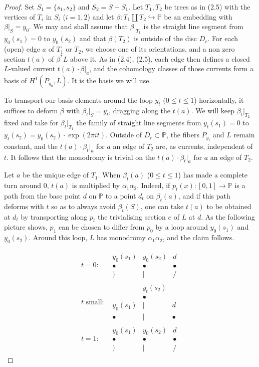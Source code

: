 \documentclass[12pt,a4paper]{article}
\theoremstyle{plain}
\theoremstyle{definition}
\theoremstyle{remark}
\newcommand{\PP}{\mathbb{P}}
\numberwithin{equation}{section}
\providecommand{\PP}{\mathbb{P}}
\begin{document}
\begin{proof}
Set $S_1 = \{s_1, s_2\}$ and $S_2 = S - S_1$. Let $T_1, T_2$ be trees as in (2.5) with the vertices of $T_i$ in $S_i$ ($i = 1, 2$) and let $\beta: T_1 \amalg T_2 \hookrightarrow \PP$ be an embedding with $\beta|_S = y_0$. We may and shall assume that $\beta|_{T_1}$ is the straight line segment from $y_0(s_1) = 0$ to $y_0(s_2)$ and that $\beta(T_2)$ is outside of the disc $D_r$. For each (open) edge $a$ of $T_1$ or $T_2$, we choose one of its orientations, and a non zero section $t(a)$ of $\beta^*L$ above it. As in (2.4), (2.5), each edge then defines a closed $L$-valued current $t(a) \cdot \beta|_a$, and the cohomology classes of those currents form a basis of $H^1(P_{y_0}, L)$. It is the basis we will use.

To transport our basis elements around the loop $y_t$ ($0 \leq t \leq 1$) horizontally, it suffices to deform $\beta$ with $\beta_t|_S = y_t$, dragging along the $t(a)$. We will keep $\beta_t|_{T_2}$ fixed and take for $\beta_t|_{T_1}$ the family of straight line segments from $y_t(s_1) = 0$ to $y_t(s_2) = y_0(s_2) \cdot \exp(2\pi i t)$. Outside of $D_r \subset \PP$, the fibers $P_{y_t}$ and $L$ remain constant, and the $t(a) \cdot \beta_t|_a$ for $a$ an edge of $T_2$ are, as currents, independent of $t$. It follows that the monodromy is trivial on the $t(a) \cdot \beta_t|_a$ for $a$ an edge of $T_2$.

Let $a$ be the unique edge of $T_1$. When $\beta_t(a)$ ($0 \leq t \leq 1$) has made a complete turn around $0$, $t(a)$ is multiplied by $\alpha_1 \alpha_2$. Indeed, if $p_t(x): [0, 1] \to \PP$ is a path from the base point $d$ on $\PP$ to a point $d_t$ on $\beta_t(a)$, and if this path deforms with $t$ so as to always avoid $\beta_t(S)$, one can take $t(a)$ to be obtained at $d_t$ by transporting along $p_t$ the trivialising section $e$ of $L$ at $d$. As the following picture shows, $p_1$ can be chosen to differ from $p_0$ by a loop around $y_0(s_1)$ and $y_0(s_2)$. Around this loop, $L$ has monodromy $\alpha_1 \alpha_2$, and the claim follows.

\[
\begin{array}{cc}
\text{$t = 0$:} & \begin{matrix} y_0(s_1) & y_0(s_2) & d \\ \bullet & \bullet & \bullet \\ ) & | & / \end{matrix} \\[2em]
\text{$t$ small:} & \begin{matrix} & y_t(s_2) & \\ & \bullet & \\ y_0(s_1) & | & d \\ \bullet & | & \bullet \end{matrix} \\[2em]
\text{$t = 1$:} & \begin{matrix} y_0(s_1) & y_0(s_2) & d \\ \bullet & \bullet & \bullet \\ ) & | & / \end{matrix}
\end{array}
\]
\end{proof}
\end{document}
